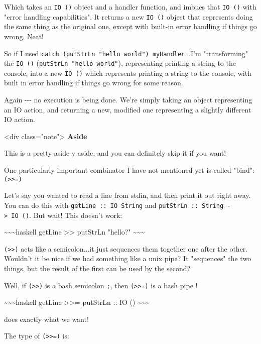 \documentclass[]{article}
\begin{document}
Which takes an \texttt{IO\ ()} object and a handler function, and imbues that
\texttt{IO\ ()} with "error handling capabilities". It returns a new
\texttt{IO\ ()} object that represents doing the same thing as the original one,
except with built-in error handling if things go wrong. Neat!

So if I used \texttt{catch\ (putStrLn\ "hello\ world")\ myHandler}...I'm
"transforming" the \texttt{IO\ ()} (\texttt{putStrLn\ "hello\ world"}),
representing printing a string to the console, into a new \texttt{IO\ ()} which
represents printing a string to the console, with built in error handling if
things go wrong for some reason.

Again -\/-\/- no execution is being done. We're simply taking an object
representing an IO action, and returning a new, modified one representing a
slightly different IO action.

\textless{}div class="note"\textgreater{} \textbf{Aside}

This is a pretty aside-y aside, and you can definitely skip it if you want!

One particularly important combinator I have not mentioned yet is called "bind":
\texttt{(\textgreater{}\textgreater{}=)}

Let's say you wanted to read a line from stdin, and then print it out right
away. You can do this with \texttt{getLine\ ::\ IO\ String} and
\texttt{putStrLn\ ::\ String\ -\textgreater{}\ IO\ ()}. But wait! This doesn't
work:

\textasciitilde{}\textasciitilde{}\textasciitilde{}haskell getLine
\textgreater{}\textgreater{} putStrLn "hello?"
\textasciitilde{}\textasciitilde{}\textasciitilde{}

\texttt{(\textgreater{}\textgreater{})} acts like a semicolon...it just
sequences them together one after the other. Wouldn't it be nice if we had
something like a unix pipe? It "sequences" the two things, but the result of the
first can be used by the second?

Well, if \texttt{(\textgreater{}\textgreater{})} is a bash semicolon \texttt{;},
then \texttt{(\textgreater{}\textgreater{}=)} is a bash pipe
\texttt{\textbar{}}!

\textasciitilde{}\textasciitilde{}\textasciitilde{}haskell getLine
\textgreater{}\textgreater{}= putStrLn :: IO ()
\textasciitilde{}\textasciitilde{}\textasciitilde{}

does exactly what we want!

The type of \texttt{(\textgreater{}\textgreater{}=)} is:
\end{document}
